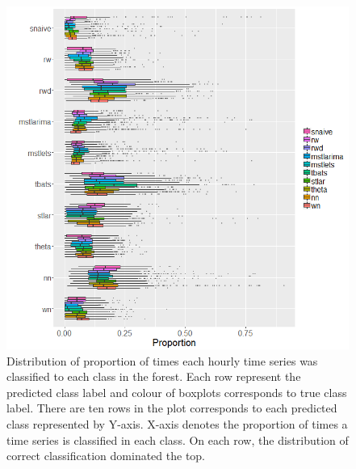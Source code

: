 \documentclass[11pt,a4paper,]{article}
\theoremstyle{definition}
\theoremstyle{definition}
\theoremstyle{definition}
\theoremstyle{remark}
\begin{document}
\begin{figure}
\centering
\includegraphics{figures/hourlyoob-1.png}
\caption{\label{fig:hourlyoob}Distribution of proportion of times each
hourly time series was classified to each class in the forest. Each row
represent the predicted class label and colour of boxplots corresponds
to true class label. There are ten rows in the plot corresponds to each
predicted class represented by Y-axis. X-axis denotes the proportion of
times a time series is classified in each class. On each row, the
distribution of correct classification dominated the top.}
\end{figure}

\newpage

\newpage
\end{document}
